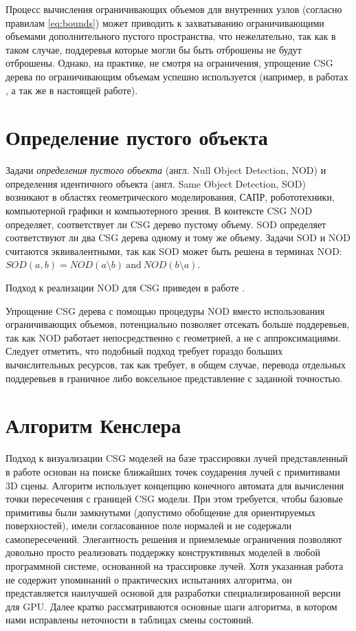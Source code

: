 Процесс вычисления ограничивающих объемов для внутренних узлов (согласно правилам \ref{eq:bounds}) может приводить к захватыванию ограничивающими объемами дополнительного пустого пространства, что нежелательно, так как в таком случае, поддеревья которые могли бы быть отброшены не будут отброшены. Однако, на практике, не смотря на ограничения, упрощение CSG дерева по ограничивающим объемам успешно используется (например, в работах , а так же в настоящей работе).

\section{Определение пустого объекта} \label{sect_csg_null_object}

Задачи \textit{определения пустого объекта} (англ. Null Object Detection, NOD) и определения идентичного объекта (англ. Same Object Detection, SOD) возникают в областях геометрического моделирования, САПР, робототехники, компьютерной графики и компьютерного зрения. В контексте CSG NOD определяет, соответствует ли CSG дерево пустому объему. SOD определяет соответствуют ли два CSG дерева одному и тому же объему. Задачи SOD и NOD считаются эквивалентными, так как SOD может быть решена в терминах NOD: $SOD(a, b) = NOD(a \setminus b) \ \text{and} \ NOD(b \setminus a)$.

Подход к реализации NOD для CSG приведен в работе .

Упрощение CSG дерева с помощью процедуры NOD вместо использования ограничивающих объемов, потенциально позволяет отсекать больше поддеревьев, так как NOD работает непосредственно с геометрией, а не с аппроксимациями. Следует отметить, что подобный подход требует гораздо больших вычислительных ресурсов, так как требует, в общем случае, перевода отдельных поддеревьев в граничное либо воксельное представление с заданной точностью.

\section{Алгоритм Кенслера} \label{sect2_kensler}

Подход к визуализации CSG моделей на базе трассировки лучей представленный в работе \todo{[8]} основан на поиске ближайших точек соударения лучей с примитивами 3D сцены. Алгоритм использует концепцию конечного автомата для вычисления точки пересечения с границей CSG модели. При этом требуется, чтобы базовые примитивы были замкнутыми (допустимо обобщение для ориентируемых поверхностей), имели согласованное поле нормалей и не содержали самопересечений. Элегантность решения и приемлемые ограничения позволяют довольно просто реализовать поддержку конструктивных моделей в любой программной системе, основанной на трассировке лучей. Хотя указанная работа не содержит упоминаний о практических испытаниях алгоритма, он представляется наилучшей основой для разработки специализированной версии для GPU. Далее кратко рассматриваются основные шаги алгоритма, в котором нами исправлены неточности в таблицах смены состояний.

